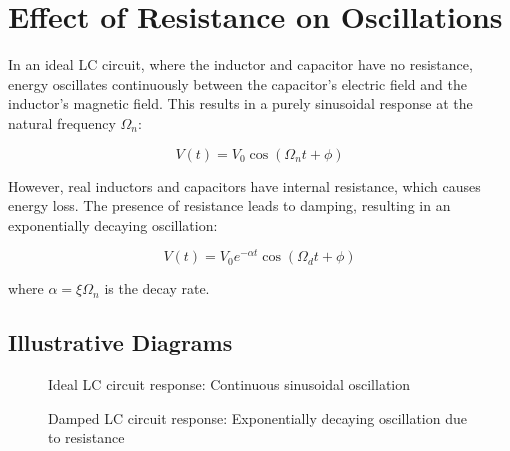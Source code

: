 \documentclass[a4paper,12pt]{article}
\begin{document}
\section{Effect of Resistance on Oscillations}

In an ideal LC circuit, where the inductor and capacitor have no resistance, energy oscillates continuously between the capacitor's electric field and the inductor's magnetic field. This results in a purely sinusoidal response at the natural frequency \(\Omega_n\):

\[
V(t) = V_0 \cos(\Omega_n t + \phi)
\]

However, real inductors and capacitors have internal resistance, which causes energy loss. The presence of resistance leads to damping, resulting in an exponentially decaying oscillation:

\[
V(t) = V_0 e^{-\alpha t} \cos(\Omega_d t + \phi)
\]

where \(\alpha = \xi \Omega_n\) is the decay rate.

\subsection{Illustrative Diagrams}

\begin{figure}[H]
    \centering
    \caption{Ideal LC circuit response: Continuous sinusoidal oscillation}
\end{figure}


\begin{figure}[H]
    \centering
    \caption{Damped LC circuit response: Exponentially decaying oscillation due to resistance}
\end{figure}
\end{document}
